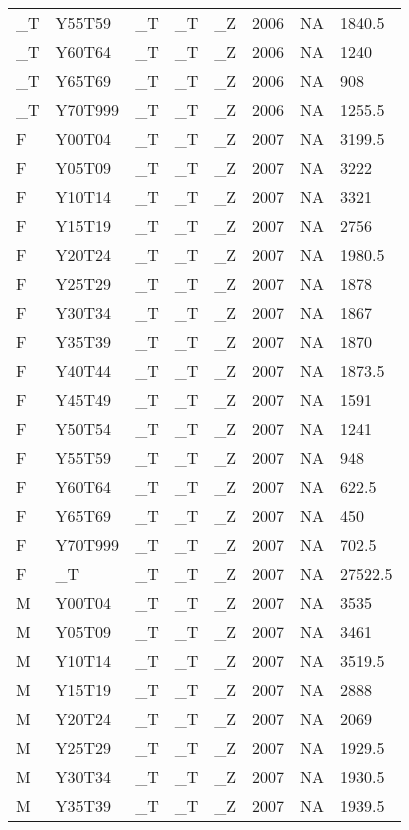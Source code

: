 \begin{longtable}[t]{llllllll}
\_T & Y55T59 & \_T & \_T & \_Z & 2006 & NA & 1840.5\\
\_T & Y60T64 & \_T & \_T & \_Z & 2006 & NA & 1240\\
\addlinespace
\_T & Y65T69 & \_T & \_T & \_Z & 2006 & NA & 908\\
\_T & Y70T999 & \_T & \_T & \_Z & 2006 & NA & 1255.5\\
F & Y00T04 & \_T & \_T & \_Z & 2007 & NA & 3199.5\\
F & Y05T09 & \_T & \_T & \_Z & 2007 & NA & 3222\\
F & Y10T14 & \_T & \_T & \_Z & 2007 & NA & 3321\\
\addlinespace
F & Y15T19 & \_T & \_T & \_Z & 2007 & NA & 2756\\
F & Y20T24 & \_T & \_T & \_Z & 2007 & NA & 1980.5\\
F & Y25T29 & \_T & \_T & \_Z & 2007 & NA & 1878\\
F & Y30T34 & \_T & \_T & \_Z & 2007 & NA & 1867\\
F & Y35T39 & \_T & \_T & \_Z & 2007 & NA & 1870\\
\addlinespace
F & Y40T44 & \_T & \_T & \_Z & 2007 & NA & 1873.5\\
F & Y45T49 & \_T & \_T & \_Z & 2007 & NA & 1591\\
F & Y50T54 & \_T & \_T & \_Z & 2007 & NA & 1241\\
F & Y55T59 & \_T & \_T & \_Z & 2007 & NA & 948\\
F & Y60T64 & \_T & \_T & \_Z & 2007 & NA & 622.5\\
\addlinespace
F & Y65T69 & \_T & \_T & \_Z & 2007 & NA & 450\\
F & Y70T999 & \_T & \_T & \_Z & 2007 & NA & 702.5\\
F & \_T & \_T & \_T & \_Z & 2007 & NA & 27522.5\\
M & Y00T04 & \_T & \_T & \_Z & 2007 & NA & 3535\\
M & Y05T09 & \_T & \_T & \_Z & 2007 & NA & 3461\\
\addlinespace
M & Y10T14 & \_T & \_T & \_Z & 2007 & NA & 3519.5\\
M & Y15T19 & \_T & \_T & \_Z & 2007 & NA & 2888\\
M & Y20T24 & \_T & \_T & \_Z & 2007 & NA & 2069\\
M & Y25T29 & \_T & \_T & \_Z & 2007 & NA & 1929.5\\
M & Y30T34 & \_T & \_T & \_Z & 2007 & NA & 1930.5\\
\addlinespace
M & Y35T39 & \_T & \_T & \_Z & 2007 & NA & 1939.5\\

\end{longtable}

